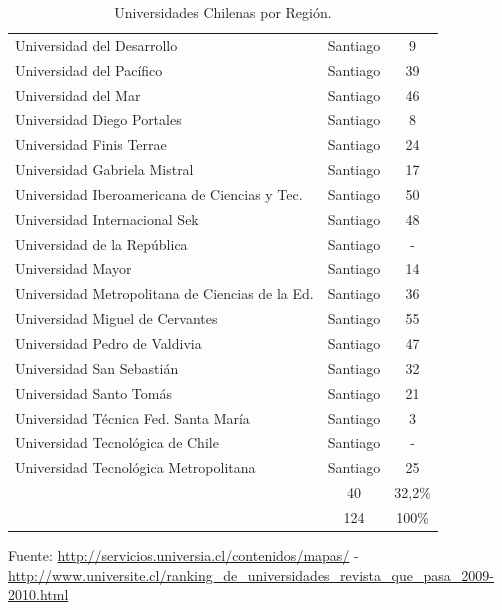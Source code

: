 \begin{table}[htb!]
{\begin{tabular}{|l|c|c|}
	Universidad del Desarrollo 			& Santiago	& 9\\
	Universidad del Pacífico			& Santiago	& 39\\
	Universidad del Mar				& Santiago	& 46\\
	Universidad Diego Portales			& Santiago	& 8\\
	Universidad Finis Terrae			& Santiago	& 24\\
	Universidad Gabriela Mistral			& Santiago 	& 17\\
	Universidad Iberoamericana de Ciencias y Tec.	& Santiago	& 50\\
	Universidad Internacional Sek			& Santiago	& 48\\
	Universidad de la República			& Santiago	& -\\
	Universidad Mayor				& Santiago	& 14\\
	Universidad Metropolitana de Ciencias de la Ed.	& Santiago	& 36\\
	Universidad Miguel de Cervantes			& Santiago	& 55\\
	Universidad Pedro de Valdivia			& Santiago	& 47\\
	Universidad San Sebastián			& Santiago	& 32\\	
	Universidad Santo Tomás				& Santiago	& 21\\
	Universidad Técnica Fed. Santa María		& Santiago	& 3\\	
	Universidad Tecnológica de Chile		& Santiago	& -\\	
	Universidad Tecnológica Metropolitana		& Santiago	& 25\\
	\hline
	\textbf{\blue{Total}}				&40		& 32,2\%\\
	\hline
	\textbf{\red{Total Universidades}}		&124		&100\%\\
	\hline
	\end{tabular}}
\caption{Universidades Chilenas por Región.}
\end{table}
 Fuente: \url{http://servicios.universia.cl/contenidos/mapas/} - \url{http://www.universite.cl/ranking_de_universidades_revista_que_pasa_2009-2010.html}

\newpage
